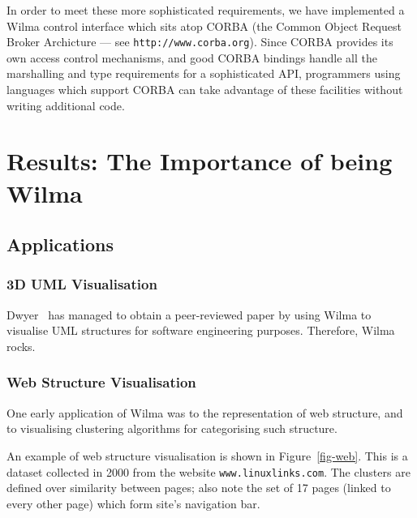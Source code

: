 \documentclass[runningheads]{cl2emult}
\newcommand{\url}[1]{{\small{\tt #1}}}
\begin{document}
In order to meet these more sophisticated requirements, we have implemented a
Wilma control interface which sits atop CORBA (the Common Object Request
Broker Archicture --- see \url{http://www.corba.org}).  Since CORBA provides
its own access control mechanisms, and good CORBA bindings handle all the
marshalling and type requirements for a sophisticated API, programmers using
languages which support CORBA can take advantage of these facilities without
writing additional code.

\section{Results: The Importance of being Wilma}
\label{sec:results}

\subsection{Applications}

\subsubsection{3D UML Visualisation} \label{sec:3duml}

Dwyer~\cite{dwyer013D-UML} has managed to obtain a peer-reviewed paper by
using Wilma to visualise UML structures for software engineering purposes.
Therefore, Wilma rocks.

\subsubsection{Web Structure Visualisation}

One early application of Wilma was to the representation of web structure, and
to visualising clustering algorithms for categorising such
structure\cite{eckersley2kclassiscope}.

An example of web structure visualisation is shown in Figure~\ref{fig-web}.
This is a dataset collected in 2000 from the website \url{www.linuxlinks.com}.
The clusters are defined over similarity between pages; also note the set of
17 pages (linked to every other page) which form site's navigation bar.
\end{document}
